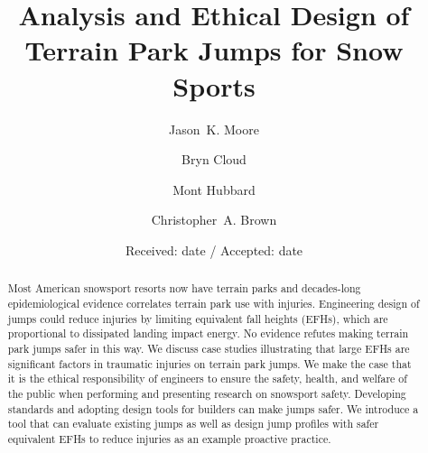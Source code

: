 \documentclass[smallextended]{svjour3}       %
\begin{document}
\title{Analysis and Ethical Design of Terrain Park Jumps for Snow Sports}

\author{
  Jason~K. Moore \and
  Bryn Cloud \and
  Mont Hubbard \and
  Christopher~A. Brown
}


\date{Received: date / Accepted: date}

\maketitle

\begin{abstract}
  Most American snowsport resorts now have terrain parks and decades-long
  epidemiological evidence correlates terrain park use with injuries.
  Engineering design of jumps could reduce injuries by limiting equivalent fall
  heights (EFHs), which are proportional to dissipated landing impact energy. No evidence
  refutes making terrain park jumps safer in this way. We discuss case studies
  illustrating that large EFHs are significant factors in traumatic injuries on
  terrain park jumps. We make the case that it is the ethical responsibility of
  engineers to ensure the safety, health, and welfare of the public when
  performing and presenting research on snowsport safety. Developing standards
  and adopting design tools for builders can make jumps safer. We introduce a
  tool that can evaluate existing jumps as well as design jump profiles with
  safer equivalent EFHs to reduce injuries as an example proactive practice.
\end{abstract}
\end{document}
